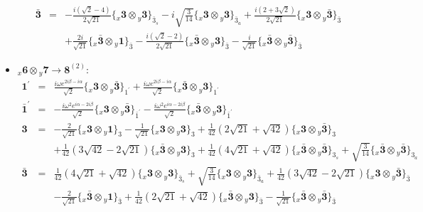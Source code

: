 \documentclass[english]{article}
\newcommand{\rep}[1]{\mathbf{#1}}
\newcommand{\repx}[2]{{}_{#2}\mathbf{#1}}
\newcommand{\subcg}[3]{\big\{ \repx{#1}{x}\otimes\repx{#2}{y}\big\}^{}_{#3}}
\begin{document}
\begin{itemize}
\begin{eqnarray*}
\rep{\bar{3}} &=& -\frac{i \left(\sqrt{2}-4\right)}{2 \sqrt{21}}\subcg{3}{3}{\bar{3}_{s}}-i \sqrt{\frac{3}{14}}\subcg{3}{3}{\bar{3}_{a}}+\frac{i \left(2+3 \sqrt{2}\right)}{2 \sqrt{21}}\subcg{3}{\bar{3}}{\bar{3}} \\ 
 & & +\frac{2 i}{\sqrt{21}}\subcg{\bar{3}}{1}{\bar{3}}-\frac{i \left(\sqrt{2}-2\right)}{2 \sqrt{21}}\subcg{\bar{3}}{3}{\bar{3}}-\frac{i}{\sqrt{21}}\subcg{\bar{3}}{\bar{3}}{\bar{3}}
\end{eqnarray*}
\item $\repx{6}{x}\otimes\repx{7}{y}\to\rep{8}^{(2)}$:
\begin{eqnarray*}
\rep{1^{\prime}} &=& \frac{i \omega  e^{2 i \beta -i \alpha }}{\sqrt{2}}\subcg{3}{\bar{3}}{1^{\prime}}+\frac{i \omega  e^{2 i \beta -i \alpha }}{\sqrt{2}}\subcg{\bar{3}}{3}{1^{\prime}}
\\
\rep{\bar{1}^{\prime}} &=& -\frac{i \omega ^2 e^{i \alpha -2 i \beta }}{\sqrt{2}}\subcg{3}{\bar{3}}{\bar{1}^{\prime}}-\frac{i \omega ^2 e^{i \alpha -2 i \beta }}{\sqrt{2}}\subcg{\bar{3}}{3}{\bar{1}^{\prime}}
\\
\rep{3} &=& -\frac{2}{\sqrt{21}}\subcg{3}{1}{3}-\frac{1}{\sqrt{21}}\subcg{3}{3}{3}+\frac{1}{42} \left(2 \sqrt{21}+\sqrt{42}\right)\subcg{3}{\bar{3}}{3} \\ 
 & & +\frac{1}{42} \left(3 \sqrt{42}-2 \sqrt{21}\right)\subcg{\bar{3}}{3}{3}+\frac{1}{42} \left(4 \sqrt{21}+\sqrt{42}\right)\subcg{\bar{3}}{\bar{3}}{3_{s}}+\sqrt{\frac{3}{14}}\subcg{\bar{3}}{\bar{3}}{3_{a}}
\\
\rep{\bar{3}} &=& \frac{1}{42} \left(4 \sqrt{21}+\sqrt{42}\right)\subcg{3}{3}{\bar{3}_{s}}+\sqrt{\frac{3}{14}}\subcg{3}{3}{\bar{3}_{a}}+\frac{1}{42} \left(3 \sqrt{42}-2 \sqrt{21}\right)\subcg{3}{\bar{3}}{\bar{3}} \\ 
 & & -\frac{2}{\sqrt{21}}\subcg{\bar{3}}{1}{\bar{3}}+\frac{1}{42} \left(2 \sqrt{21}+\sqrt{42}\right)\subcg{\bar{3}}{3}{\bar{3}}-\frac{1}{\sqrt{21}}\subcg{\bar{3}}{\bar{3}}{\bar{3}}
\end{eqnarray*}
\end{itemize}
\end{document}
